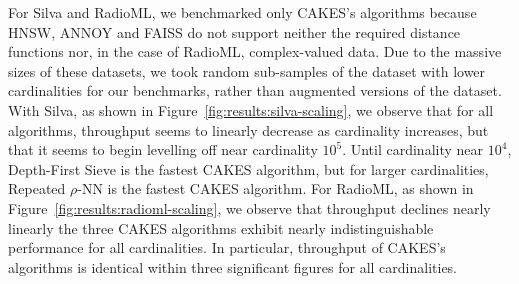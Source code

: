 For Silva and RadioML, we benchmarked only CAKES's algorithms because HNSW, ANNOY and FAISS do not support neither the required distance functions nor, in the case of RadioML, complex-valued data.
Due to the massive sizes of these datasets, we took random sub-samples of the dataset with lower cardinalities for our benchmarks, rather than augmented versions of the dataset.
With Silva, as shown in Figure~\ref{fig:results:silva-scaling}, we observe that for all algorithms, throughput seems to linearly decrease as cardinality increases, but that it seems to begin levelling off near cardinality $10^5$.
Until cardinality near $10^4$, Depth-First Sieve is the fastest CAKES algorithm, but for larger cardinalities, Repeated $\rho$-NN is the fastest CAKES algorithm.
For RadioML, as shown in Figure~\ref{fig:results:radioml-scaling}, we observe that throughput declines nearly linearly the three CAKES algorithms exhibit nearly indistinguishable performance for all cardinalities.
In particular, throughput of CAKES's algorithms is identical within three significant figures for all cardinalities.


